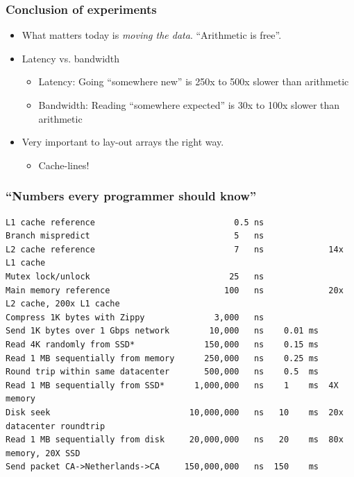 \documentclass[sans,mathserif]{beamer}
\begin{document}
\begin{frame}
  \frametitle{Conclusion of experiments}
  \begin{itemize}
  \item<+-> What matters today is {\em moving the data}. ``Arithmetic is free''.
    \item<+-> Latency vs. bandwidth
      \begin{itemize}
      \item Latency: Going ``somewhere new'' is 250x to 500x slower than arithmetic
      \item Bandwidth: Reading ``somewhere expected'' is 30x to 100x slower than arithmetic
      \end{itemize}
  \item<+-> Very important to lay-out arrays the right way.
    \begin{itemize}
    \item Cache-lines!
    \end{itemize}
  \end{itemize}
\end{frame}

\begin{frame}[fragile]
  \frametitle{``Numbers every programmer should know''}
{\small
\begin{verbatim}
L1 cache reference                            0.5 ns
Branch mispredict                             5   ns
L2 cache reference                            7   ns             14x L1 cache
Mutex lock/unlock                            25   ns
Main memory reference                       100   ns             20x L2 cache, 200x L1 cache
Compress 1K bytes with Zippy              3,000   ns
Send 1K bytes over 1 Gbps network        10,000   ns    0.01 ms
Read 4K randomly from SSD*              150,000   ns    0.15 ms
Read 1 MB sequentially from memory      250,000   ns    0.25 ms
Round trip within same datacenter       500,000   ns    0.5  ms
Read 1 MB sequentially from SSD*      1,000,000   ns    1    ms  4X memory
Disk seek                            10,000,000   ns   10    ms  20x datacenter roundtrip
Read 1 MB sequentially from disk     20,000,000   ns   20    ms  80x memory, 20X SSD
Send packet CA->Netherlands->CA     150,000,000   ns  150    ms
\end{verbatim}
}
\end{frame}
\end{document}
